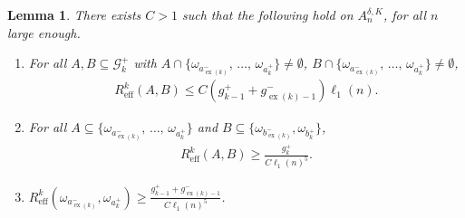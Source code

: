 \documentclass[10pt]{amsart}
\newtheorem{lemm}[theo]{Lemma}\newtheorem{prop}[theo]{Proposition}\newtheorem{coro}[theo]{Corollary}\newtheorem{conj}[theo]{Conjecture}
\theoremstyle{definition}\newtheorem{defi}[theo]{Definition}\newtheorem{rema}[theo]{Remark}\newtheorem{exam}[theo]{Example}\newtheorem{exem}[theo]{Example}\newtheorem{nota}[theo]{Notation}
\newcommand{\clG}{\mathcal{G}}
\newcommand{\eff}{\mathrm{eff}}
\newcommand\ex{\operatorname{ex}}
\newcommand{\aat}[1]{a_{\ex(#1)}^-}
\newcommand{\bt}[1]{b_{\ex(#1)}^-}
\newcommand{\gtt}[1]{g_{\ex(#1)-1}^-}
\newcommand*{\romanenumi}{\renewcommand*{\theenumi}{\roman{enumi}}}
\begin{document}
\begin{lemm}\label{lem:R_bounds}
There exists $C>1$ such that the following hold on $A_n^{\delta,K}$, for all $n$ large enough.
\begin{enumerate}\romanenumi
\item\label{lemm3.2.1} For all $A,B\subseteq\clG_k^+$ with $A\cap \{\omega_{\aat{k}},\,\dots,\,\omega_{a_k^+}\}\neq\emptyset$, $B\cap \{\omega_{\aat{k}},\,\dots,\,\omega_{a_k^+}\}\neq\emptyset$,
\begin{align*}
{R}^k_\eff(A,B)\leq C \left(g_{k-1}^++\gtt{k}\right)\ell_1(n).
\end{align*}
\item\label{lemm3.2.2} For all $A\subseteq\{\omega_{\aat{k}},\,\dots,\,\omega_{a_k^+}\}$ and $B\subseteq \{\omega_{\bt{k}},\omega_{b_k^+}\}$,
\begin{align*}
{R}^k_\eff(A,B)\geq \frac{g_k^+}{C\ell_1(n)^5}.
\end{align*}
\item\label{lemm3.2.3} ${R}^k_\eff(\omega_{\aat{k}},\omega_{a_k^+})\geq \frac{g_{k-1}^++\gtt{k}}{C\ell_1(n)^5}$.
\end{enumerate}
\end{lemm}
\end{document}
